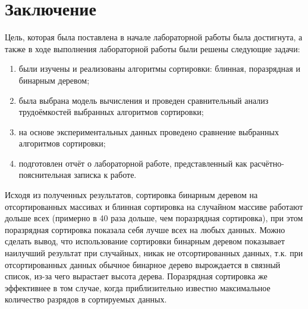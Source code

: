 \chapter*{Заключение}

Цель, которая была поставлена в начале лабораторной работы была достигнута, а также в ходе выполнения лабораторной работы были решены следующие задачи:

\begin{enumerate}[label=\arabic*)]
	\item были изучены и реализованы алгоритмы сортировки: блинная, поразрядная и бинарным деревом;
	\item была выбрана модель вычисления и проведен сравнительный анализ трудоёмкостей выбранных алгоритмов сортировки;
    \item на основе экспериментальных данных проведено сравнение выбранных алгоритмов сортировки;
	\item подготовлен отчёт о лабораторной работе, представленный как расчётно-пояснительная записка к работе.
\end{enumerate}

Исходя из полученных результатов, сортировка бинарным деревом на отсортированных массивах и блинная сортировка на случайном массиве работают дольше всех (примерно в 40 раза дольше, чем поразрядная сортировка), при этом поразрядная сортировка показала себя лучше всех на любых данных. Можно сделать вывод, что использование сортировки бинарным деревом показывает наилучший результат при случайных, никак не отсортированных данных, т.к. при отсортированных данных обычное бинарное дерево вырождается в связный список, из-за чего вырастает высота дерева. Поразрядная сортировка же эффективнее в том случае, когда приблизительно известно максимальное количество разрядов в сортируемых данных.